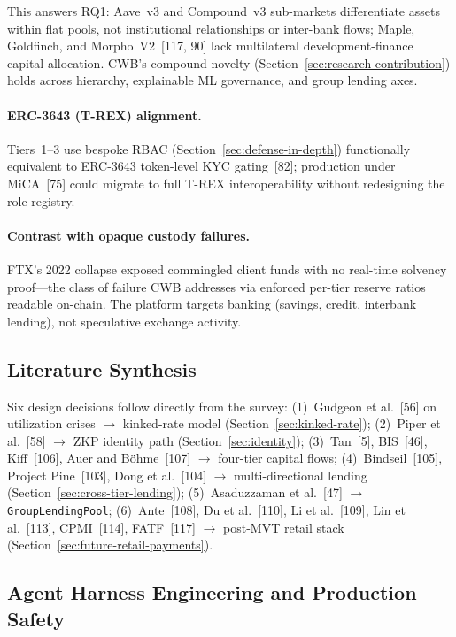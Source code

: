\documentclass[12pt, a4paper]{report}
\begin{document}
This answers RQ1: Aave~v3 and Compound~v3 sub-markets differentiate assets within flat pools, not institutional relationships or inter-bank flows; Maple, Goldfinch, and Morpho~V2~[117, 90] lack multilateral development-finance capital allocation. CWB's compound novelty (Section~\ref{sec:research-contribution}) holds across hierarchy, explainable ML governance, and group lending axes.

\paragraph{ERC-3643 (T-REX) alignment.}
Tiers~1--3 use bespoke RBAC (Section~\ref{sec:defense-in-depth}) functionally equivalent to ERC-3643 token-level KYC gating~[82]; production under MiCA~[75] could migrate to full T-REX interoperability without redesigning the role registry.

\paragraph{Contrast with opaque custody failures.}
FTX's 2022 collapse exposed commingled client funds with no real-time solvency proof---the class of failure CWB addresses via enforced per-tier reserve ratios readable on-chain. The platform targets banking (savings, credit, interbank lending), not speculative exchange activity.

\subsection{Literature Synthesis}

Six design decisions follow directly from the survey: (1)~Gudgeon et al.~[56] on utilization crises $\to$ kinked-rate model (Section~\ref{sec:kinked-rate}); (2)~Piper et al.~[58] $\to$ ZKP identity path (Section~\ref{sec:identity}); (3)~Tan~[5], BIS~[46], Kiff~[106], Auer and B\"{o}hme~[107] $\to$ four-tier capital flows; (4)~Bindseil~[105], Project Pine~[103], Dong et al.~[104] $\to$ multi-directional lending (Section~\ref{sec:cross-tier-lending}); (5)~Asaduzzaman et al.~[47] $\to$ \texttt{GroupLendingPool}; (6)~Ante~[108], Du et al.~[110], Li et al.~[109], Lin et al.~[113], CPMI~[114], FATF~[117] $\to$ post-MVT retail stack (Section~\ref{sec:future-retail-payments}).

\subsection{Agent Harness Engineering and Production Safety}
\label{sec:harness-lit}
\end{document}
